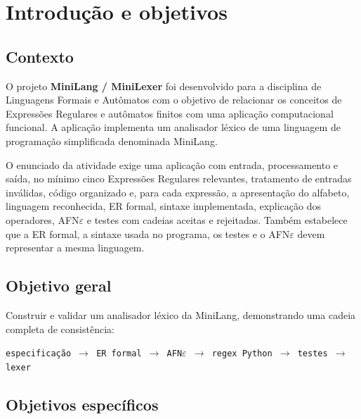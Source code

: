 \chapter{Introdução e objetivos}

\section{Contexto}

O projeto \textbf{MiniLang / MiniLexer} foi desenvolvido para a disciplina de Linguagens Formais e Autômatos com o objetivo de relacionar os conceitos de Expressões Regulares e autômatos finitos com uma aplicação computacional funcional. A aplicação implementa um analisador léxico de uma linguagem de programação simplificada denominada MiniLang.

O enunciado da atividade exige uma aplicação com entrada, processamento e saída, no mínimo cinco Expressões Regulares relevantes, tratamento de entradas inválidas, código organizado e, para cada expressão, a apresentação do alfabeto, linguagem reconhecida, ER formal, sintaxe implementada, explicação dos operadores, AFN$\varepsilon$ e testes com cadeias aceitas e rejeitadas. Também estabelece que a ER formal, a sintaxe usada no programa, os testes e o AFN$\varepsilon$ devem representar a mesma linguagem.

\section{Objetivo geral}

Construir e validar um analisador léxico da MiniLang, demonstrando uma cadeia completa de consistência:

\begin{center}
\texttt{especificação $\rightarrow$ ER formal $\rightarrow$ AFN$\varepsilon$ $\rightarrow$ regex Python $\rightarrow$ testes $\rightarrow$ lexer}
\end{center}

\section{Objetivos específicos}

